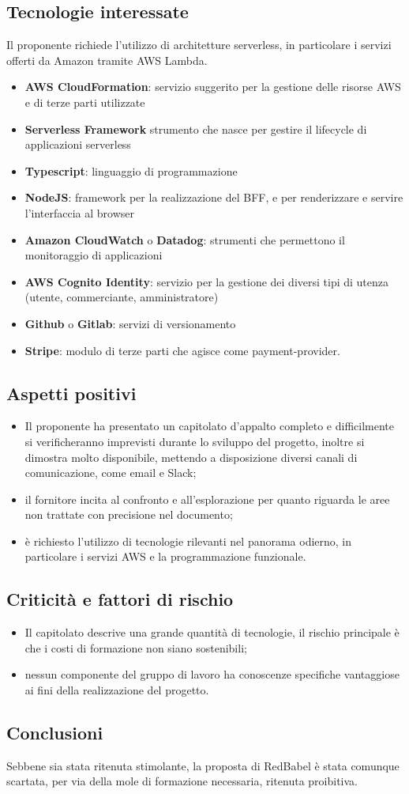 \subsection{Tecnologie interessate}
Il proponente richiede l'utilizzo di architetture serverless, in particolare i servizi offerti da Amazon tramite AWS Lambda.
\begin{itemize}
	\item \textbf{AWS CloudFormation}: servizio suggerito per la gestione delle risorse AWS e di terze parti utilizzate
  \item \textbf{Serverless Framework} strumento che nasce per gestire il lifecycle di applicazioni serverless
	\item \textbf{Typescript}: linguaggio di programmazione
	\item \textbf{NodeJS}: framework per la realizzazione del BFF, e per renderizzare e servire l'interfaccia al browser
	\item \textbf{Amazon CloudWatch} o \textbf{Datadog}: strumenti che permettono il monitoraggio di applicazioni
	\item \textbf{AWS Cognito Identity}: servizio per la gestione dei diversi tipi di utenza (utente, commerciante, amministratore)
	\item \textbf{Github} o \textbf{Gitlab}: servizi di versionamento
	\item \textbf{Stripe}: modulo di terze parti che agisce come payment-provider.
\end{itemize}
\subsection{Aspetti positivi}
\begin{itemize}
    \item Il proponente ha presentato un capitolato d'appalto completo e difficilmente si verificheranno imprevisti durante lo sviluppo del progetto, inoltre si dimostra molto disponibile, mettendo a disposizione diversi canali di comunicazione, come email e Slack;
    \item il fornitore incita al confronto e all'esplorazione per quanto riguarda le aree non trattate con precisione nel documento;
    \item è richiesto l'utilizzo di tecnologie rilevanti nel panorama odierno, in particolare i servizi AWS e la programmazione funzionale.
\end{itemize}
\subsection{Criticità e fattori di rischio}
\begin{itemize}
    \item Il capitolato descrive una grande quantità di tecnologie, il rischio principale è che i costi di formazione non siano sostenibili;
    \item nessun componente del gruppo di lavoro ha conoscenze specifiche vantaggiose ai fini della realizzazione del progetto.
\end{itemize}
\subsection{Conclusioni}
Sebbene sia stata ritenuta stimolante, la proposta di RedBabel è stata comunque scartata, per via della mole di formazione necessaria, ritenuta proibitiva.